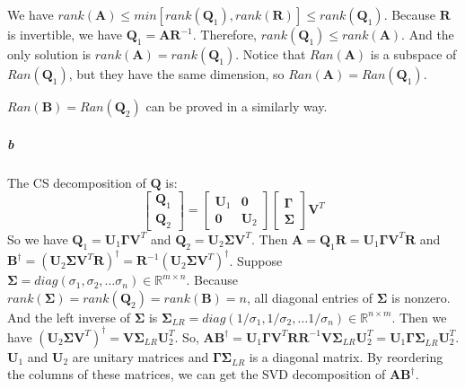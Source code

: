 \documentclass[22pt]{article}
\begin{document}
	We have $rank(\mathbf{A}) \leq min[rank(\mathbf{Q}_1),rank(\mathbf{R})] \leq rank(\mathbf{Q}_1) $. Because $\mathbf{R}$ is invertible, we have $\mathbf{Q}_1 = \mathbf{AR}^{-1}$. Therefore, $rank(\mathbf{Q}_1) \leq rank(\mathbf{A}) $. And the only solution is $rank(\mathbf{A}) = rank(\mathbf{Q}_1) $. Notice that $Ran(\mathbf{A}) $ is a subspace of $Ran(\mathbf{Q}_1)$, but they have the same dimension, so $Ran(\mathbf{A}) =Ran(\mathbf{Q}_1)$.

	$Ran(\mathbf{B}) =Ran(\mathbf{Q}_2)$ can be proved in a similarly way.

	\subparagraph{b} The CS decomposition of $\mathbf{Q}$ is:
	\begin{equation}
		\left[\begin{array}{c} \mathbf{Q}_1 \\ \mathbf{Q}_2 \end{array}\right] = \left[\begin{array}{cc} \mathbf{U}_1 & \mathbf{0}\\ \mathbf{0} & \mathbf{U}_2 \end{array}\right]\left[\begin{array}{c} \mathbf{\Gamma} \\ \mathbf{\Sigma} \end{array}\right] \mathbf{V}^T
	\end{equation}
	So we have $\mathbf{Q}_1 = \mathbf{U}_1\mathbf{\Gamma V}^T$ and $\mathbf{Q}_2 = \mathbf{U}_2\mathbf{\Sigma V}^T$. Then $\mathbf{A=Q}_1\mathbf{R} = \mathbf{U}_1\mathbf{\Gamma V}^T\mathbf{R}$ and $\mathbf{B}^\dagger =  (\mathbf{U}_2\mathbf{\Sigma V}^T\mathbf{R})^\dagger = \mathbf{R}^{-1} (\mathbf{U}_2\mathbf{\Sigma V}^T)^\dagger$. Suppose $\mathbf{\Sigma} = diag(\sigma_1,\sigma_2,\dots \sigma_n) \in \mathbb{R}^{m\times n}$. Because $rank(\mathbf{\Sigma}) = rank(\mathbf{Q}_2) =rank(\mathbf{B})=n$, all diagonal entries of $\mathbf{\Sigma}$ is nonzero. And the left inverse of $\mathbf{\Sigma}$ is $\mathbf{\Sigma}_{LR} = diag(1/\sigma_1,1/\sigma_2,\dots 1/\sigma_n) \in \mathbb{R}^{n\times m}$. Then we have $(\mathbf{U}_2\mathbf{\Sigma V}^T)^\dagger = \mathbf{V \Sigma}_{LR}\mathbf{U}_2^T$.
	So, $\mathbf{AB}^\dagger = \mathbf{U}_1\mathbf{\Gamma V}^T\mathbf{RR}^{-1}\mathbf{V \Sigma}_{LR}\mathbf{U}_2^T = \mathbf{U}_1\mathbf{\Gamma \Sigma}_{LR}\mathbf{U}_2^T$. $\mathbf{U}_1$ and $\mathbf{U}_2$ are unitary matrices and $\mathbf{\Gamma \Sigma}_{LR}$ is a diagonal matrix. By reordering the columns of these matrices, we can get the SVD decomposition of $\mathbf{AB}^\dagger$.
\end{document}

